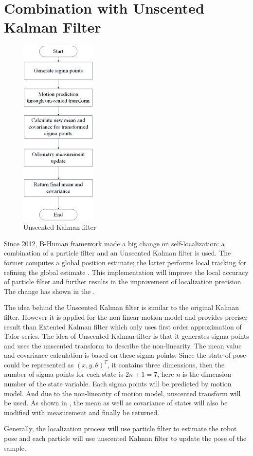 \section{Combination with Unscented Kalman Filter}
\begin{figure}[!htb]
    \includegraphics[width=0.34\textwidth]{pics/ukf.jpg}
    \centering
    \caption{Unscented Kalman filter}
    \label{fig: ukf}
\end{figure}
Since 2012, B-Human framework made a big change on self-localization: a combination of a particle filter and an Unscented Kalman filter is used.
The former computes a global position estimate; the latter performs local tracking for refining the global estimate \cite{BHumanCodeRelease2012}. 
This implementation will improve the local accuracy of particle filter and further results in the improvement of localization precision. The change has shown in the  . 

The idea behind the Unscented Kalman filter is similar to the original Kalman filter. However it is applied for the non-linear motion model and provides preciser result than Extented Kalman filter which only uses first order approximation of Talor series. The idea of Unscented Kalman filter is that it generates sigma points and uses the unscented transform to describe the non-linearity. The mean value and covariance calculation is based on these sigma points. Since the state of pose could be represented as $(x,y,\theta)^T$, it contains three dimensions, then the number of sigma points for each state is $2n+1=7$, here $n$ is the dimension number of the state variable. Each sigma points will be predicted by motion model. And due to the non-linearity of motion model, unscented transform will be used.  As shown in , the mean as well as covariance of states will also be modified with measurement and finally be returned. 

Generally, the localization process will use particle filter to estimate the robot pose and each particle will use unscented Kalman filter to update the pose of the sample.
